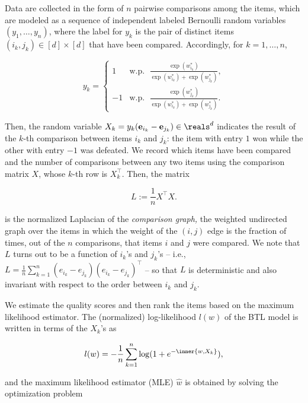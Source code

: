 Data are collected in the form of $n$ pairwise comparisons among the items, which are modeled as a sequence of independent labeled Bernoulli random variables $(y_1,\ldots,y_n)$, where the label for $y_k$ is the pair of distinct items $(i_k, j_k) \in [d] \times [d]$ that have been compared. Accordingly, for  $k=1,\ldots,n$,

\begin{equation} \label{eq:BTL_model}
y_k = \left\{ 
\begin{array}{cc}
1  & \text{w.p. }\; \frac{\exp(w^*_{i_k})}{\exp(w^*_{i_k})+\exp(w^*_{j_k})}, \\
 -1  & \text{w.p. }\; \frac{\exp(w^*_{j_k})}{\exp(w^*_{i_k})+\exp(w^*_{j_k})}.
\end{array}
\right.

\end{equation}

Then, the random variable $X_k = y_k (\mathbf{e}_{i_k} - \mathbf{e}_{j_k}) \in \reals^d$ indicates the result of the $k$-th comparison between items $i_k$ and $j_k$: the item with entry $1$ won while the other with entry $-1$ was defeated. We record which items have been compared and the number of comparisons between any two items using the comparison matrix $X$, whose $k$-th row is $X_k^\top$. Then, the matrix

\begin{equation}
    L := \frac{1}{n} X^\top X.
\end{equation}

is the normalized Laplacian of the {\it comparison graph,} the weighted undirected graph over the items in which the weight of the $(i,j)$ edge  is the fraction of times, out of the  $n$ comparisons, that items $i$ and $j$ were compared. We note that $L$ turns out to be a function of $i_k$'s and $j_k$'s -- i.e., $L = \frac{1}{n} \sum_{k=1}^n (e_{i_k} - e_{j_k}) (e_{i_k} - e_{j_k})^\top$ -- so that $L$ is deterministic and also invariant with respect to the order between $i_k$ and $j_k$. 

We estimate the quality scores and then rank the items based on the maximum likelihood estimator. The (normalized) log-likelihood $l(w)$ of the BTL model is written in terms of the $X_k$'s as

\begin{equation} \label{eq:loglikelihood}
    l(w) = - \frac{1}{n} \sum_{k=1}^n \log(1+e^{-\inner{w,X_k}}),
\end{equation}

and the maximum likelihood estimator (MLE) $\hat{w}$ is obtained by solving the optimization problem

